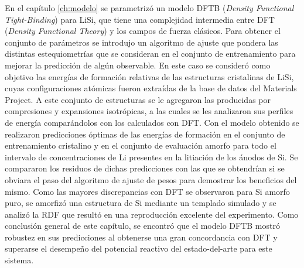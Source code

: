 En el capítulo \ref{ch:modelo} se parametrizó un modelo DFTB (\textit{Density 
Functional Tight-Binding}) para LiSi, que tiene una complejidad intermedia entre 
DFT (\textit{Density Functional Theory}) y los campos de fuerza clásicos. Para 
obtener el conjunto de parámetros se introdujo un algoritmo de ajuste que pondera
las distintas estequiometrías que se consideran en el conjunto de entrenamiento 
para mejorar la predicción de algún observable. En este caso se consideró como 
objetivo las energías de formación relativas de las estructuras cristalinas de 
LiSi, cuyas configuraciones atómicas fueron extraídas de la base de datos del Materials Project.
A este conjunto de estructuras se le agregaron las producidas por compresiones y 
expansiones isotrópicas, a las cuales se les analizaron sus perfiles de energía 
comparándolos con los calculados con DFT. Con el modelo obtenido se realizaron
predicciones óptimas de las energías de formación en el conjunto de entrenamiento 
cristalino y en el conjunto de evaluación amorfo para todo el intervalo de
concentraciones de Li presentes en la litiación de los ánodos de Si. Se compararon 
los residuos de dichas predicciones con las que se obtendrían si se obviara el 
paso del algoritmo de ajuste de pesos para demostrar los beneficios del mismo.
Como las mayores discrepancias con DFT se observaron para Si amorfo puro, se 
amorfizó una estructura de Si mediante un templado simulado y se analizó la RDF 
que resultó en una reproducción excelente del experimento. Como conclusión 
general de este capítulo, se encontró que el modelo DFTB mostró robustez en sus predicciones al
obtenerse una gran concordancia con DFT y superarse el desempeño del potencial 
reactivo del estado-del-arte para este sistema.

